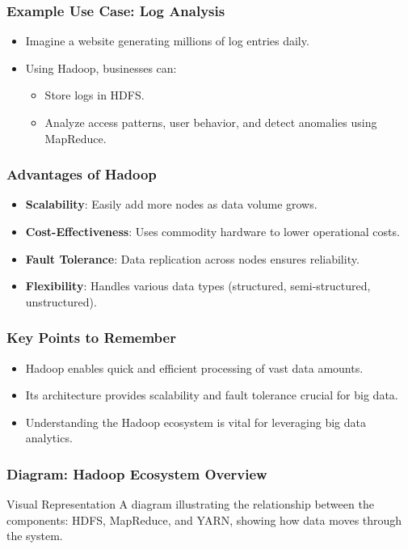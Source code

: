 \documentclass[aspectratio=169]{beamer}
\begin{document}
\begin{frame}[fragile]
    \frametitle{Example Use Case: Log Analysis}
    \begin{itemize}
        \item Imagine a website generating millions of log entries daily.
        \item Using Hadoop, businesses can:
        \begin{itemize}
            \item Store logs in HDFS.
            \item Analyze access patterns, user behavior, and detect anomalies using MapReduce.
        \end{itemize}
    \end{itemize}
\end{frame}

\begin{frame}[fragile]
    \frametitle{Advantages of Hadoop}
    \begin{itemize}
        \item \textbf{Scalability}: Easily add more nodes as data volume grows.
        \item \textbf{Cost-Effectiveness}: Uses commodity hardware to lower operational costs.
        \item \textbf{Fault Tolerance}: Data replication across nodes ensures reliability.
        \item \textbf{Flexibility}: Handles various data types (structured, semi-structured, unstructured).
    \end{itemize}
\end{frame}

\begin{frame}[fragile]
    \frametitle{Key Points to Remember}
    \begin{itemize}
        \item Hadoop enables quick and efficient processing of vast data amounts.
        \item Its architecture provides scalability and fault tolerance crucial for big data.
        \item Understanding the Hadoop ecosystem is vital for leveraging big data analytics.
    \end{itemize}
\end{frame}

\begin{frame}[fragile]
    \frametitle{Diagram: Hadoop Ecosystem Overview}
    \begin{block}{Visual Representation}
        A diagram illustrating the relationship between the components: HDFS, MapReduce, and YARN, showing how data moves through the system.
    \end{block}
\end{frame}
\end{document}
